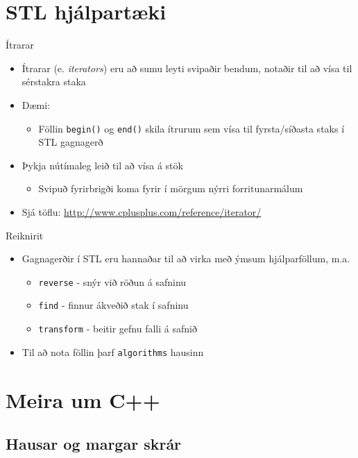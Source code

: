 \documentclass[handout]{beamer}
\begin{document}
\section{STL hjálpartæki}

\begin{frame}{Ítrarar}
\begin{itemize}
 \item Ítrarar (e. \emph{iterators}) eru að sumu leyti svipaðir bendum, notaðir til að vísa til sérstakra staka
 \item Dæmi:
 \begin{itemize}
  \item Föllin \texttt{begin()} og \texttt{end()} skila ítrurum sem vísa til fyrsta/síðasta staks í STL gagnagerð
 \end{itemize}
 \item Þykja nútímaleg leið til að vísa á stök
 \begin{itemize}
  \item Svipuð fyrirbrigði koma fyrir í mörgum nýrri forritunarmálum
 \end{itemize}
 \item Sjá töflu: \url{http://www.cplusplus.com/reference/iterator/}
\end{itemize}

\end{frame}


\begin{frame}{Reiknirit}
\begin{itemize}
 \item Gagnagerðir í STL eru hannaðar til að virka með ýmsum hjálparföllum, m.a.
 \begin{itemize}
  \item \texttt{reverse} - snýr við röðun á safninu
  \item \texttt{find} - finnur ákveðið stak í safninu
  \item \texttt{transform} - beitir gefnu falli á safnið
 \end{itemize}
 \item Til að nota föllin þarf \texttt{algorithms} hausinn
\end{itemize}
\end{frame}

\section{Meira um C++}

\subsection{Hausar og margar skrár}
\end{document}
